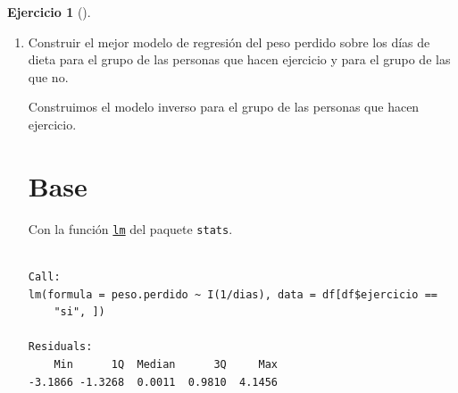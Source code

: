 \documentclass[
  a4paper,
]{scrreport}
\newenvironment{Shaded}{\begin{snugshade}}{\end{snugshade}}
\newcommand{\DecValTok}[1]{\textcolor[rgb]{0.68,0.00,0.00}{#1}}
\newcommand{\FunctionTok}[1]{\textcolor[rgb]{0.28,0.35,0.67}{#1}}
\newcommand{\NormalTok}[1]{\textcolor[rgb]{0.00,0.23,0.31}{#1}}
\newcommand{\OtherTok}[1]{\textcolor[rgb]{0.00,0.23,0.31}{#1}}
\newcommand{\SpecialCharTok}[1]{\textcolor[rgb]{0.37,0.37,0.37}{#1}}
\newcommand{\StringTok}[1]{\textcolor[rgb]{0.13,0.47,0.30}{#1}}
\theoremstyle{definition}
\newtheorem{exercise}{Ejercicio}[chapter]
\theoremstyle{remark}
\begin{document}
\begin{exercise}[]
\begin{enumerate}
\begin{tcolorbox}
  El mejor modelo en el grupo de los que hacen ejercicio es el inverso y
  en el grupo de los que no el sigmoidal. Los modelos han mejorado
  bastante con respecto al modelo anterior, sobre todo el del grupo de
  personas que hace ejercicio.

  \end{tcolorbox}
\item
  Construir el mejor modelo de regresión del peso perdido sobre los días
  de dieta para el grupo de las personas que hacen ejercicio y para el
  grupo de las que no.

  \begin{tcolorbox}[enhanced jigsaw, colframe=quarto-callout-tip-color-frame, toprule=.15mm, bottomtitle=1mm, breakable, opacitybacktitle=0.6, toptitle=1mm, colback=white, bottomrule=.15mm, title=\textcolor{quarto-callout-tip-color}{\faLightbulb}\hspace{0.5em}{Solución}, arc=.35mm, left=2mm, titlerule=0mm, rightrule=.15mm, coltitle=black, leftrule=.75mm, opacityback=0, colbacktitle=quarto-callout-tip-color!10!white]

  Construimos el modelo inverso para el grupo de las personas que hacen
  ejercicio.

  \section{Base}

  Con la función
  \href{https://www.rdocumentation.org/packages/stats/versions/3.6.2/topics/lm}{\texttt{lm}}
  del paquete \texttt{stats}.

\begin{Shaded}
\end{Shaded}

\begin{verbatim}

Call:
lm(formula = peso.perdido ~ I(1/dias), data = df[df$ejercicio == 
    "si", ])

Residuals:
    Min      1Q  Median      3Q     Max 
-3.1866 -1.3268  0.0011  0.9810  4.1456 


\end{verbatim}
\end{tcolorbox}
\end{enumerate}
\end{exercise}
\end{document}
